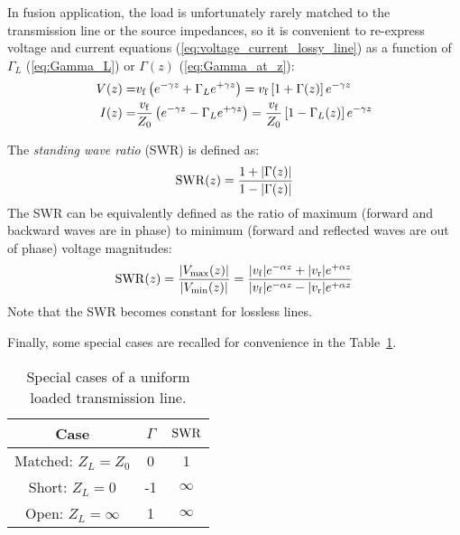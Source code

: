 In fusion application, the load is unfortunately rarely matched to the transmission line or the source impedances, so it is convenient to re-express voltage and current equations (\ref{eq:voltage_current_lossy_line}) as a function of $\Gamma_L$ (\ref{eq:Gamma_L}) or $\Gamma(z)$ (\ref{eq:Gamma_at_z}):
\begin{subequations}
	\begin{align}
		V(z) =& {v_{\mathrm{f}}} \left( e^{-\gamma z} + \Gamma_L e^{+\gamma z} \right) 
			= {v_{\mathrm{f}}} \left[ 1 + \Gamma(z) \right]  e^{-\gamma z} \\
		I(z) =& \frac{{v_{\mathrm{f}}}}{Z_0} \left( e^{-\gamma z} - \Gamma_L e^{+\gamma z} \right)
			= \frac{{v_{\mathrm{f}}}}{Z_0} \left[ 1 - \Gamma_L(z)  \right]e^{-\gamma z}
	\end{align}
	\label{eq:voltage_current_lossy_line_gamma}
\end{subequations} 

The \textit{standing wave ratio} (SWR) is defined as:
\begin{equation}
	{\mathrm{SWR}}(z) = \frac{1 + |\Gamma(z)|}{1 - |\Gamma(z)|}
	\label{eq:SWR}
\end{equation}
The SWR can be equivalently defined as the ratio of maximum (forward and backward waves are in phase) to minimum (forward and reflected waves are out of phase) voltage magnitudes: 
\begin{equation}
{\mathrm{SWR}}(z) = \frac{|V_\mathrm{max}(z)|}{|V_\mathrm{min}(z)|} = \frac{|{v_{\mathrm{f}}}|e^{-\alpha z} + |{v_{\mathrm{r}}}|e^{+\alpha z}}{|{v_{\mathrm{f}}}|e^{-\alpha z} - |{v_{\mathrm{r}}}|e^{+\alpha z}}
\label{eq:SWR_max_to_min_voltages}
\end{equation}
Note that the SWR becomes constant for lossless lines. 


Finally, some special cases are recalled for convenience in the Table~\ref{tab:special_case_loaded_line}.

\begin{table}[h]
	\begin{center}
\begin{tabular}{|c|c|c|}
	\hline 
	Case & $\Gamma$ & ${\mathrm{SWR}}$ \\ 
	\hline 
	Matched: $Z_L = Z_0$ & 0 & 1 \\ 
	\hline 
	Short: $Z_L=0$ & -1 & $\infty$ \\ 
	\hline 
	Open: $Z_L = \infty$ & 1 & $\infty$ \\
	\hline
\end{tabular}
	\end{center}
\caption{Special cases of a uniform loaded transmission line.}
\label{tab:special_case_loaded_line} 
\end{table}


